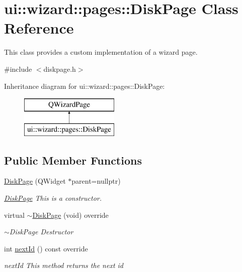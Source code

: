 \hypertarget{classui_1_1wizard_1_1pages_1_1_disk_page}{}\section{ui\+:\+:wizard\+:\+:pages\+:\+:Disk\+Page Class Reference}
\label{classui_1_1wizard_1_1pages_1_1_disk_page}


This class provides a custom implementation of a wizard page.  




{\ttfamily \#include $<$diskpage.\+h$>$}

Inheritance diagram for ui\+:\+:wizard\+:\+:pages\+:\+:Disk\+Page\+:\begin{figure}[H]
\begin{center}
\leavevmode
\includegraphics[height=2.000000cm]{classui_1_1wizard_1_1pages_1_1_disk_page}
\end{center}
\end{figure}
\subsection*{Public Member Functions}
\begin{DoxyCompactItemize}
\item 
\mbox{\hyperlink{classui_1_1wizard_1_1pages_1_1_disk_page_a7962a9459e0cb49c1f587de2d595cc04}{Disk\+Page}} (Q\+Widget $\ast$parent=nullptr)
\begin{DoxyCompactList}\small\item\em \mbox{\hyperlink{classui_1_1wizard_1_1pages_1_1_disk_page}{Disk\+Page}} This is a constructor. \end{DoxyCompactList}\item 
virtual \mbox{\hyperlink{classui_1_1wizard_1_1pages_1_1_disk_page_adb9feba7b9ac2bbfa5b944920a2328e3}{$\sim$\+Disk\+Page}} (void) override
\begin{DoxyCompactList}\small\item\em $\sim$\+Disk\+Page Destructor \end{DoxyCompactList}\item 
int \mbox{\hyperlink{classui_1_1wizard_1_1pages_1_1_disk_page_ac6cb9ab53d89deac235d43251b333354}{next\+Id}} () const override
\begin{DoxyCompactList}\small\item\em next\+Id This method returns the next id \end{DoxyCompactList}\end{DoxyCompactItemize}


